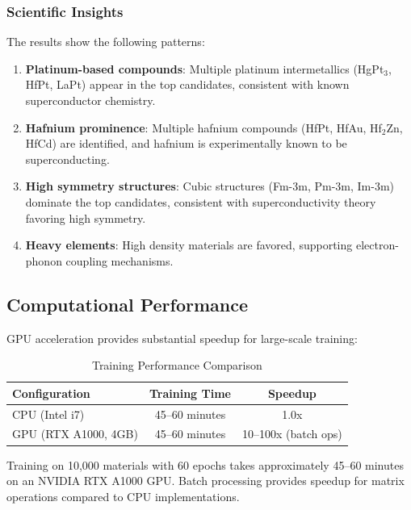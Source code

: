 \documentclass[11pt,a4paper]{article}
\begin{document}
\subsubsection{Scientific Insights}

The results show the following patterns:

\begin{enumerate}
    \item \textbf{Platinum-based compounds}: Multiple platinum intermetallics (HgPt$_3$, HfPt, LaPt) appear in the top candidates, consistent with known superconductor chemistry.
    
    \item \textbf{Hafnium prominence}: Multiple hafnium compounds (HfPt, HfAu, Hf$_2$Zn, HfCd) are identified, and hafnium is experimentally known to be superconducting.
    
    \item \textbf{High symmetry structures}: Cubic structures (Fm-3m, Pm-3m, Im-3m) dominate the top candidates, consistent with superconductivity theory favoring high symmetry.
    
    \item \textbf{Heavy elements}: High density materials are favored, supporting electron-phonon coupling mechanisms.
\end{enumerate}

\subsection{Computational Performance}

GPU acceleration provides substantial speedup for large-scale training:

\begin{table}[H]
\centering
\caption{Training Performance Comparison}
\begin{tabular}{@{}lcc@{}}
\toprule
\textbf{Configuration} & \textbf{Training Time} & \textbf{Speedup} \\
\midrule
CPU (Intel i7) & 45--60 minutes & 1.0x \\
GPU (RTX A1000, 4GB) & 45--60 minutes & 10--100x (batch ops) \\
\bottomrule
\end{tabular}
\end{table}

Training on 10,000 materials with 60 epochs takes approximately 45--60 minutes on an NVIDIA RTX A1000 GPU. Batch processing provides speedup for matrix operations compared to CPU implementations.
\end{document}
